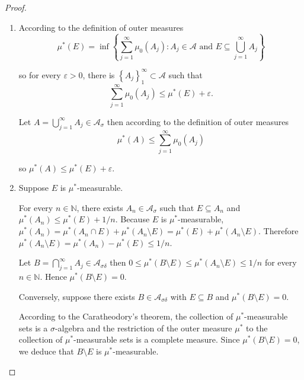 \begin{proof}
    \begin{enumerate}[itemsep=0pt,label={\textbf{\alph*.}}]
        \item According to the definition of outer measures
              \[
                  \mu^{\ast}(E) = \inf\left\{ \sum_{j=1}^{\infty} \mu_{0}(A_{j}) : A_{j} \in \mathcal{A} \text{ and } E \subseteq \bigcup_{j=1}^{\infty} A_{j} \right\}
              \]

              so for every \( \varepsilon > 0 \), there is \( {\left\{ A_{j} \right\}}_{1}^{\infty} \subset \mathcal{A} \) such that
              \[
                  \sum_{j=1}^{\infty} \mu_{0}(A_{j}) \le \mu^{\ast}(E) + \varepsilon.
              \]

              Let \( A = \bigcup_{j=1}^{\infty} A_{j} \in \mathcal{A}_{\sigma} \) then according to the definition of outer measures
              \[
                  \mu^{\ast}(A) \le \sum_{j=1}^{\infty} \mu_{0}(A_{j})
              \]

              so \( \mu^{\ast}(A) \le \mu^{\ast}(E) + \varepsilon \).
        \item Suppose \( E \) is \( \mu^{\ast} \)-measurable.

              For every \( n \in \mathbb{N} \), there exists \( A_{n} \in \mathcal{A}_{\sigma} \) such that \( E \subseteq A_{n} \) and \( \mu^{\ast}(A_{n}) \le \mu^{\ast}(E) + 1/n \). Because \( E \) is \( \mu^{\ast} \)-measurable, \( \mu^{\ast}(A_{n}) = \mu^{\ast}(A_{n} \cap E) + \mu^{\ast}(A_{n} \setminus E) = \mu^{\ast}(E) + \mu^{\ast}(A_{n} \setminus E) \). Therefore \( \mu^{\ast}(A_{n} \setminus E) = \mu^{\ast}(A_{n}) - \mu^{\ast}(E) \le 1/n \).

              Let \( B = \bigcap_{j=1}^{\infty} A_{j} \in \mathcal{A}_{\sigma\delta} \) then \( 0 \le \mu^{\ast}(B\setminus E) \le \mu^{\ast}(A_{n}\setminus E) \le 1/n \) for every \( n \in \mathbb{N} \). Hence \( \mu^{\ast}(B \setminus E) = 0 \).

              \bigskip

              Conversely, suppose there exists \( B \in \mathcal{A}_{\sigma\delta} \) with \( E \subseteq B \) and \( \mu^{\ast}(B \setminus E) = 0 \).

              According to the Caratheodory's theorem, the collection of \( \mu^{\ast} \)-measurable sets is a \( \sigma \)-algebra and the restriction of the outer measure \( \mu^{\ast} \) to the collection of \( \mu^{\ast} \)-measurable sets is a complete measure. Since \( \mu^{\ast}(B \setminus E) = 0 \), we deduce that \( B \setminus E \) is \( \mu^{\ast} \)-measurable.


\end{enumerate}
\end{proof}
